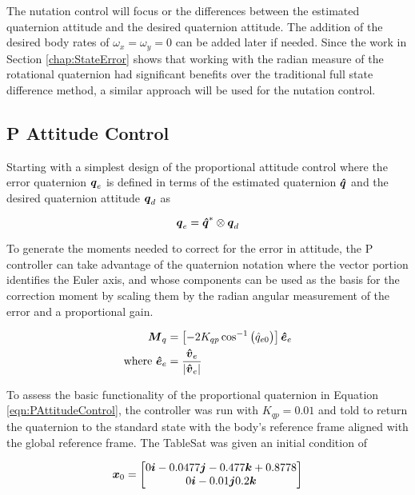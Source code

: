 The nutation control will focus or the differences between the estimated quaternion attitude and the desired quaternion attitude.  The addition of the desired body rates of $\omega_x = \omega_y = 0$ can be added later if needed.  Since the work in Section \ref{chap:StateError} shows that working with the radian measure of the rotational quaternion had significant benefits over the traditional full state difference method, a similar approach will be used for the nutation control.

\subsection{P Attitude Control}
\label{subsec:PAttitudeControl}

Starting with a simplest design of the proportional attitude control where the error quaternion $\boldsymbol{q}_e$ is defined in terms of the estimated quaternion $\boldsymbol{\hat{q}}$ and the desired quaternion attitude $\boldsymbol{q}_d$ as

\begin{equation}
  \boldsymbol{q}_e = \boldsymbol{\hat{q}}^* \otimes \boldsymbol{q}_d
\end{equation}

To generate the moments needed to correct for the error in attitude, the P controller can take advantage of the quaternion notation where the vector portion identifies the Euler axis, and whose components can be used as the basis for the correction moment by scaling them by the radian angular measurement of the error and a proportional gain.

\begin{subequations}
  \begin{align}
    \boldsymbol{M}_{q} &= \left[-2 K_{qp} \cos^{-1} \big(\hat{q}_{e0} \big) \right] \boldsymbol{\hat{e}}_e \\
    \text{where } \boldsymbol{\hat{e}}_e &= \frac{\boldsymbol{\hat{v}}_e}{|\boldsymbol{\hat{v}}_e|}
  \end{align}
  \label{eqn:PAttitudeControl}
\end{subequations}

To assess the basic functionality of the proportional quaternion in Equation \ref{eqn:PAttitudeControl}, the controller was run with $K_{qp} = 0.01$ and told to return the quaternion to the standard state with the body's reference frame aligned with the global reference frame.  The TableSat was given an initial condition of

\begin{equation}
  \boldsymbol{x}_0 = \begin{bmatrix} 0 \boldsymbol{i} -0.0477 \boldsymbol{j} -0.477 \boldsymbol{k} +0.8778 \\ 0 \boldsymbol{i} -0.01 \boldsymbol{j} 0.2 \boldsymbol{k} \end{bmatrix}
\end{equation}


